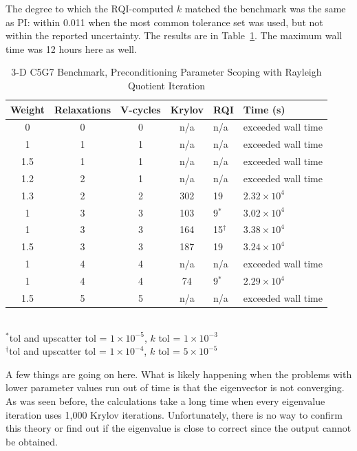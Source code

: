 The degree to which the RQI-computed $k$ matched the benchmark was the same as PI: within 0.011 when the most common tolerance set was used, but not within the reported uncertainty. The results are in Table~\ref{table:3-D c5g7 rqi}. The maximum wall time was 12 hours here as well. 
%
\begin{table}[!h]
\caption{3-D C5G7 Benchmark, Preconditioning Parameter Scoping with Rayleigh Quotient Iteration}
\begin{center}
\begin{tabular}{| c | c | c | c | l | l |}
\hline
Weight & Relaxations & V-cycles & Krylov & RQI & Time (s) \\[0.5ex]
\hline
0    & 0 & 0 & n/a     & n/a          & exceeded wall time \\
1    & 1 & 1 & n/a     & n/a          & exceeded wall time \\
1.5 & 1 & 1 & n/a     & n/a          & exceeded wall time \\
1.2 & 2 & 1 & n/a     & n/a          & exceeded wall time \\
1.3 & 2 & 2 & 302    & 19           & $2.32 \times 10^{4}$ \\
1    & 3 & 3 & 103    & 9$^{*}$    & $3.02 \times 10^{4}$ \\
1    & 3 & 3 & 164    & 15$^{\dag}$ & $3.38 \times 10^{4}$ \\
1.5 & 3 & 3 & 187    & 19           & $3.24 \times 10^{4}$ \\
1    & 4 & 4 & n/a     & n/a          & exceeded wall time \\
1    & 4 & 4 & 74     & 9$^{*}$    & $2.29 \times 10^{4}$ \\
1.5 & 5 & 5 & n/a     & n/a          & exceeded wall time \\
\hline 
\end{tabular}\\
$^{*}$tol and upscatter tol = $1 \times 10^{-5}$, $k$ tol = $1 \times 10^{-3}$\\
$^{\dag}$tol and upscatter tol = $1 \times 10^{-4}$, $k$ tol = $5 \times 10^{-5}$
\end{center}
\label{table:3-D c5g7 rqi}
\end{table}  

A few things are going on here. What is likely happening when the problems with lower parameter values run out of time is that the eigenvector is not converging. As was seen before, the calculations take a long time when every eigenvalue iteration uses 1,000 Krylov iterations. Unfortunately, there is no way to confirm this theory or find out if the eigenvalue is close to correct since the output cannot be obtained. 

